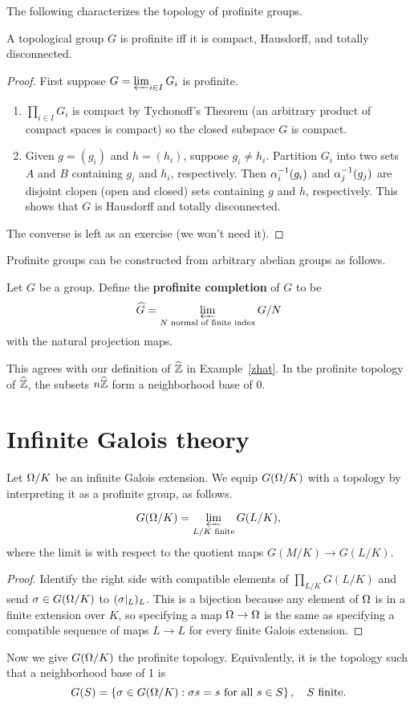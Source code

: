 The following characterizes the topology of profinite groups.
\begin{pr}
A topological group $G$ is profinite iff it is compact, Hausdorff, and totally disconnected.
\end{pr}
\begin{proof}
First suppose $G=\varprojlim_{i\in I}G_i$ is profinite.
\begin{enumerate}
\item
$\prod_{i\in I} G_i$ is compact by Tychonoff's Theorem (an arbitrary product of compact spaces is compact) so the closed subspace $G$ is compact.
\item 
Given $g=(g_i)$ and $h=(h_i)$, suppose $g_i\ne h_i$. Partition $G_i$ into two sets $A$ and $B$ containing $g_i$ and $h_i$, respectively. Then $\alpha_i^{-1}(g_i)$ and $\alpha_j^{-1}(g_j)$ are disjoint clopen (open and closed) sets containing $g$ and $h$, respectively. This shows that $G$ is Hausdorff and totally disconnected.
\end{enumerate}
The converse is left as an exercise (we won't need it).
\end{proof}
Profinite groups can be constructed from arbitrary abelian groups as follows.
\begin{df}
Let $G$ be a group. Define the \textbf{profinite completion} of $G$ to be
\[
\widehat{G}=\varprojlim_{N\text{ normal of finite index}}G/N
\]
with the natural projection maps.
\end{df}
\begin{ex}
This agrees with our definition of $\widehat{\mathbb{Z}}$ in Example~\ref{zhat}. In the profinite topology of $\widehat{\mathbb{Z}}$, the subsets $n\widehat{\mathbb{Z}}$ form a neighborhood base of 0. 
\end{ex}
\section{Infinite Galois theory}
Let $\Omega/K$ be an infinite Galois extension. We equip $G(\Omega/K)$ with a topology by interpreting it as a profinite group, as follows.
\begin{pr}
\[G(\Omega/K)=\varprojlim_{L/K\text{ finite}}G(L/K),\]
where the limit is with respect to the quotient maps $G(M/K)\to G(L/K)$.
\end{pr}
\begin{proof}
Identify the right side with compatible elements of $\prod_{L/K} G(L/K)$ and send $\sigma\in G(\Omega/K)$ to $(\sigma|_L)_L$. This is a bijection because any element of $\Omega$ is in a finite extension over $K$, so specifying a map $\Omega\to \Omega$ is the same as specifying a compatible sequence of maps $L\to L$ for every finite Galois extension.
\end{proof}
Now we give $G(\Omega/K)$ the profinite topology. Equivalently, it is the topology such that a neighborhood base of 1 is
\[
G(S)=\left\{{\sigma \in G(\Omega/K)}:{\sigma s=s\text{ for all } s\in S}\right\},\quad S\text{ finite}.
\]

